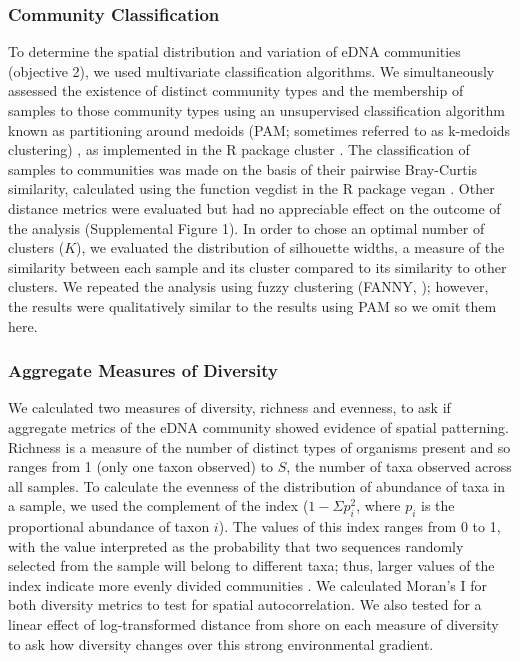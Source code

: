 \documentclass[11pt,letterpaper]{article} %
\begin{document}
\subsubsection*{Community Classification}
To determine the spatial distribution and variation of eDNA communities (objective 2), we used multivariate classification algorithms. We simultaneously assessed the existence of distinct community types and the membership of samples to those community types using an unsupervised classification algorithm known as partitioning around medoids (PAM; sometimes referred to as k-medoids clustering) \citep{Kaufman1990}, as implemented in the R package cluster \citep{cluster}. The classification of samples to communities was made on the basis of their pairwise Bray-Curtis similarity, calculated using the function vegdist in the R package vegan \citep{vegan}. Other distance metrics were evaluated but had no appreciable effect on the outcome of the analysis (Supplemental Figure 1). In order to chose an optimal number of clusters ($K$), we evaluated the distribution of silhouette widths, a measure of the similarity between each sample and its cluster compared to its similarity to other clusters. We repeated the analysis using fuzzy clustering (FANNY, \citep{Kaufman1990}); however, the results were qualitatively similar to the results using PAM so we omit them here.


\subsubsection*{Aggregate Measures of Diversity}
We calculated two measures of diversity, richness and evenness, to ask if aggregate metrics of the eDNA community showed evidence of spatial patterning. Richness is a measure of the number of distinct types of organisms present and so ranges from 1 (only one taxon observed) to $S$, the number of taxa observed across all samples. To calculate the evenness of the distribution of abundance of taxa in a sample, we used the complement of the \citet{Simpson1949} index ($1 - \Sigma{p_{i}^2}$, where $p_i$ is the proportional abundance of taxon $i$). The values of this index ranges from 0 to 1, with the value interpreted as the probability that two sequences randomly selected from the sample will belong to different taxa; thus, larger values of the index indicate more evenly divided communities \citep{Magurran2004}. We calculated Moran's I for both diversity metrics to test for spatial autocorrelation. We also tested for a linear effect of log-transformed distance from shore on each measure of diversity to ask how diversity changes over this strong environmental gradient.
\end{document}
